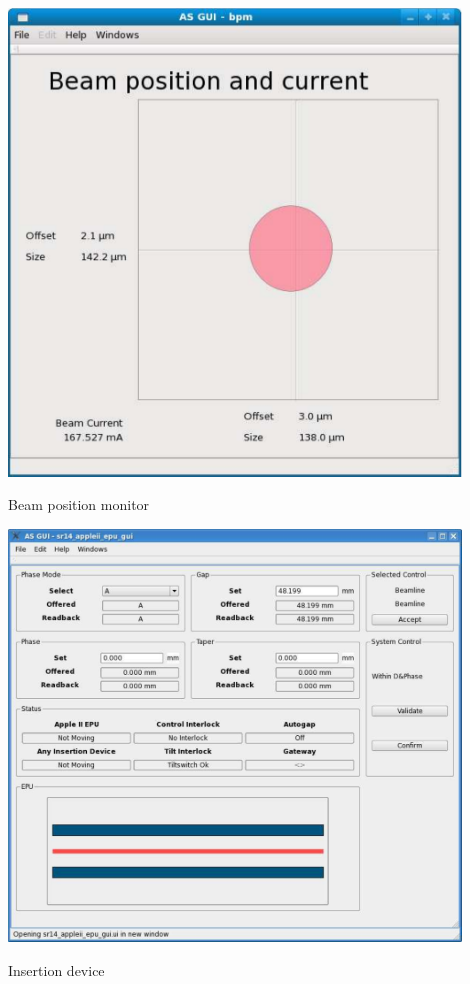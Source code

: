  
\begin{DoxyImage}
\includegraphics[width=12cm]{ASguiExample3}
\caption{Beam position monitor}
\end{DoxyImage}
 \par
\par


 
\begin{DoxyImage}
\includegraphics[width=12cm]{ASguiExample4}
\caption{Insertion device}
\end{DoxyImage}
 \par
\par


